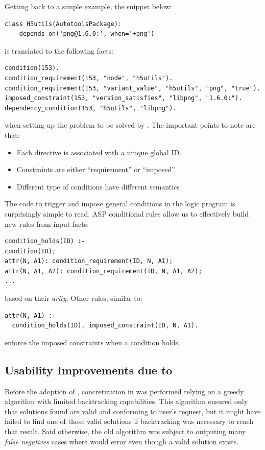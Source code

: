 Getting back to a simple example, the snippet below:
\begin{verbatim}
class H5utils(AutotoolsPackage):
    depends_on('png@1.6.0:', when='+png')
\end{verbatim}
is translated to the following facts:
\begin{verbatim}
condition(153).
condition_requirement(153, "node", "h5utils").
condition_requirement(153, "variant_value", "h5utils", "png", "true").
imposed_constraint(153, "version_satisfies", "libpng", "1.6.0:").
dependency_condition(153, "h5utils", "libpng").
\end{verbatim}
when setting up the problem to be solved by \clingo. The important points to note are that:
\begin{itemize}
\item Each directive is associated with a unique global ID.
\item Constraints are either ``requirement'' or ``imposed''. 
\item Different type of conditions have different semantics\footnotemark
\end{itemize}
The code to trigger and impose general conditions in the logic program is surprisingly simple to read. ASP conditional rules allow us to effectively build new rules from input facts:
\begin{verbatim}
condition_holds(ID) :-
condition(ID);
attr(N, A1): condition_requirement(ID, N, A1);
attr(N, A1, A2): condition_requirement(ID, N, A1, A2);
...
\end{verbatim}
based on their \emph{arity}. Other rules, similar to:
\begin{verbatim}
attr(N, A1) :- 
  condition_holds(ID), imposed_constraint(ID, N, A1).
\end{verbatim}
enforce the imposed constraints when a condition holds.

\subsection{Usability Improvements due to \clingo}
Before the adoption of \clingo, concretization in \spack{} was performed relying on a greedy algorithm with limited backtracking capabilities. This algorithm ensured only that solutions found are valid and conforming to user's request, but it might have failed to find one of those valid solutions if backtracking was necessary to reach that result. Said otherwise, the old algorithm was subject to outputing many \emph{false negatives} \textemdash{} cases where \spack{} would error even though a valid solution exists.

